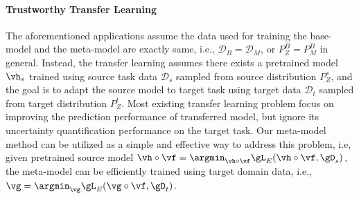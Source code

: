 \paragraph{Trustworthy Transfer Learning}
The aforementioned applications assume the data used for training the base-model and the meta-model are exactly same, i.e., $\mathcal{D}_{B} = \mathcal{D}_{M}$, or $P^B_{Z} = P^B_{M}$ in general. Instead, the transfer learning assumes there exists a pretrained model $\vh_s$ trained using source task data $\mathcal{D}_{s}$ sampled from source distribution $P^s_{Z}$, and the goal is to adapt the source model to target task using target data $\mathcal{D}_{t}$ sampled from target distribution $P^t_{Z}$. Most existing transfer learning problem focus on improving the prediction performance of transferred model, but ignore its uncertainty quantification performance on the target task. Our meta-model method can be utilized as a simple and effective way to address this problem, i.e, given pretrained source model $\vh \circ \vf = \argmin_{\vh \circ \vf} \gL_E(\vh \circ \vf,\gD_s)$, the meta-model can be efficiently trained using target domain data, i.e., $\vg = \argmin_{\vg} \gL_E(\vg \circ \vf,\gD_t)$.  